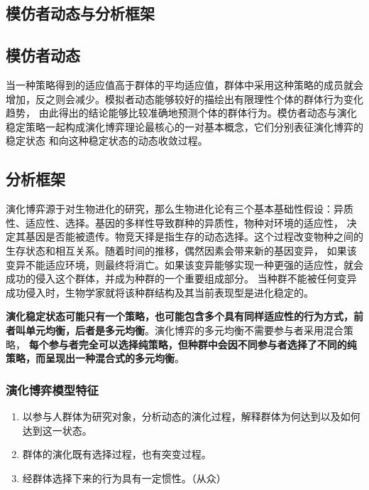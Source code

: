 \documentclass[12pt, a4paper]{article} %
\begin{document}
\begin{CJK*}{UTF8}{gbsn}
        \clearpage
        \section{模仿者动态与分析框架}
        \subsection{模仿者动态}
        当一种策略得到的适应值高于群体的平均适应值，群体中采用这种策略的成员就会增加，反之则会减少。模拟者动态能够较好的描绘出有限理性个体的群体行为变化趋势，
        由此得出的结论能够比较准确地预测个体的群体行为。模仿者动态与演化稳定策略一起构成演化博弈理论最核心的一对基本概念，它们分别表征演化博弈的稳定状态
        和向这种稳定状态的动态收敛过程。

        \subsection{分析框架}
        演化博弈源于对生物进化的研究，那么生物进化论有三个基本基础性假设：异质性、适应性、选择。基因的多样性导致群种的异质性，物种对环境的适应性，
        决定其基因是否能被遗传。物竞天择是指生存的动态选择。这个过程改变物种之间的生存状态和相互关系。随着时间的推移，偶然因素会带来新的基因变异，
        如果该变异不能适应环境，则最终将消亡。如果该变异能够实现一种更强的适应性，就会成功的侵入这个群体，并成为种群的一个重要组成部分。
        当种群不能被任何变异成功侵入时，生物学家就将该种群结构及其当前表现型是进化稳定的。\par

        \textbf{演化稳定状态可能只有一个策略，也可能包含多个具有同样适应性的行为方式，前者叫单元均衡，后者是多元均衡}。演化博弈的多元均衡不需要参与者采用混合策略，
        \textbf{每个参与者完全可以选择纯策略，但种群中会因不同参与者选择了不同的纯策略，而呈现出一种混合式的多元均衡}。

        \subsubsection{演化博弈模型特征}
        \begin{enumerate}
            \item 以参与人群体为研究对象，分析动态的演化过程，解释群体为何达到以及如何达到这一状态。
            \item 群体的演化既有选择过程，也有突变过程。
            \item 经群体选择下来的行为具有一定惯性。（从众）
        \end{enumerate}


\end{CJK*}
\end{document}
